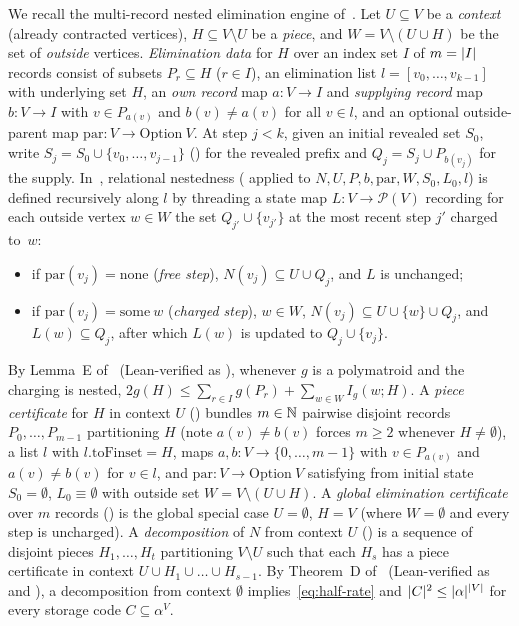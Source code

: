 We recall the multi-record nested elimination engine of~\cite[Section~3]{SeventhPaper2026}. Let $U \subseteq V$ be a
\emph{context} (already contracted vertices), $H \subseteq V \setminus U$ be a \emph{piece}, and $W = V \setminus (U \cup H)$
be the set of \emph{outside} vertices. \emph{Elimination data} for $H$ over an index set $I$ of $m = \lvert I \rvert$ records
consist of subsets $P_r \subseteq H$ ($r \in I$), an elimination list $l = [v_0, \dots, v_{k-1}]$ with underlying set $H$,
an \emph{own record} map $a : V \to I$ and \emph{supplying record} map $b : V \to I$ with $v \in P_{a(v)}$ and $b(v) \ne a(v)$
for all $v \in l$, and an optional outside-parent map $\mathrm{par} : V \to \mathrm{Option}\ V$. At step $j < k$, given an
initial revealed set $S_0$, write $S_j = S_0 \cup \{v_0, \dots, v_{j-1}\}$ () for the revealed prefix
and $Q_j = S_j \cup P_{b(v_j)}$ for the supply. In~\cite{SeventhPaper2026}, relational nestedness
( applied to $N, U, P, b, \mathrm{par}, W, S_0, L_0, l$) is defined recursively along $l$ by
threading a state map $L : V \to \mathcal{P}(V)$ recording for each outside vertex $w \in W$ the set $Q_{j'} \cup \{v_{j'}\}$
at the most recent step $j'$ charged to~$w$:
\begin{itemize}
\item if $\mathrm{par}(v_j) = \mathrm{none}$ (\emph{free step}), $N(v_j) \subseteq U \cup Q_j$, and $L$ is unchanged;
\item if $\mathrm{par}(v_j) = \mathrm{some}\ w$ (\emph{charged step}), $w \in W$, $N(v_j) \subseteq U \cup \{w\} \cup Q_j$,
  and $L(w) \subseteq Q_j$, after which $L(w)$ is updated to $Q_j \cup \{v_j\}$.
\end{itemize}
By Lemma~E of~\cite[Section~3.1, Lemma~3.2]{SeventhPaper2026} (Lean-verified as ),
whenever $g$ is a polymatroid and the charging is nested, $2 g(H) \le \sum_{r \in I} g(P_r) + \sum_{w \in W} I_g(w; H)$.
A \emph{piece certificate} for $H$ in context $U$ () bundles $m \in \mathbb{N}$ pairwise disjoint records
$P_0, \dots, P_{m-1}$ partitioning $H$ (note $a(v) \ne b(v)$ forces $m \ge 2$ whenever $H \ne \emptyset$), a list $l$ with
$l.\mathrm{toFinset} = H$, maps $a, b : V \to \{0, \dots, m-1\}$ with $v \in P_{a(v)}$ and $a(v) \ne b(v)$ for $v \in l$,
and $\mathrm{par} : V \to \mathrm{Option}\ V$ satisfying  from initial state $S_0 = \emptyset$,
$L_0 \equiv \emptyset$ with outside set $W = V \setminus (U \cup H)$. A \emph{global elimination certificate} over $m$
records () is the global special case $U = \emptyset$, $H = V$ (where $W = \emptyset$ and every step
is uncharged). A \emph{decomposition} of $N$ from context $U$ () is a sequence of disjoint pieces
$H_1, \dots, H_t$ partitioning $V \setminus U$ such that each $H_s$ has a piece certificate in context
$U \cup H_1 \cup \dots \cup H_{s-1}$. By Theorem~D of~\cite[Section~3.2]{SeventhPaper2026} (Lean-verified as
 and ), a decomposition from context $\emptyset$
implies~\eqref{eq:half-rate} and $\lvert C \rvert^2 \le \lvert \alpha \rvert^{\lvert V \rvert}$ for every storage code $C \subseteq \alpha^V$.

